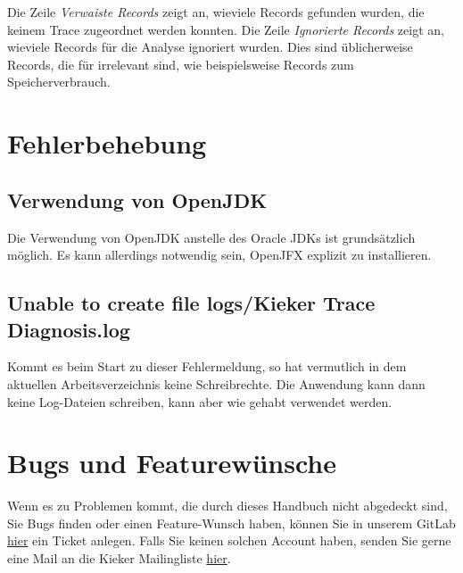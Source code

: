 \documentclass{article}
\begin{document}
  Die Zeile \textit{Verwaiste Records} zeigt an, wieviele Records gefunden wurden, die keinem Trace zugeordnet werden konnten.
  Die Zeile \textit{Ignorierte Records} zeigt an, wieviele Records für die Analyse ignoriert wurden.
  Dies sind üblicherweise Records, die für \KiekerTraceDiagnosis{} irrelevant sind, wie beispielsweise Records zum Speicherverbrauch.

  \section{Fehlerbehebung}

  \subsection{Verwendung von OpenJDK}\label{OpenJDK}
  Die Verwendung von OpenJDK anstelle des Oracle JDKs ist grundsätzlich möglich. Es kann allerdings notwendig sein, OpenJFX explizit zu installieren.

  \subsection{Unable to create file logs/Kieker Trace Diagnosis.log}\label{LogSchreibrechte}
  Kommt es beim Start zu dieser Fehlermeldung, so hat \KiekerTraceDiagnosis{} vermutlich in dem aktuellen Arbeitsverzeichnis keine Schreibrechte.
  Die Anwendung kann dann keine Log-Dateien schreiben, kann aber wie gehabt verwendet werden.

  \section{Bugs und Featurewünsche}
  Wenn es zu Problemen kommt, die durch dieses Handbuch nicht abgedeckt sind, Sie Bugs finden oder einen Feature-Wunsch haben, können Sie in unserem GitLab \href{http://build.se.informatik.uni-kiel.de/gitlab/kieker/kieker-trace-diagnosis/issues/}{hier} ein Ticket anlegen.
  Falls Sie keinen solchen Account haben, senden Sie gerne eine Mail an die Kieker Mailingliste \href{https://lists.sourceforge.net/lists/listinfo/kieker-users}{hier}.
  
\end{document}
